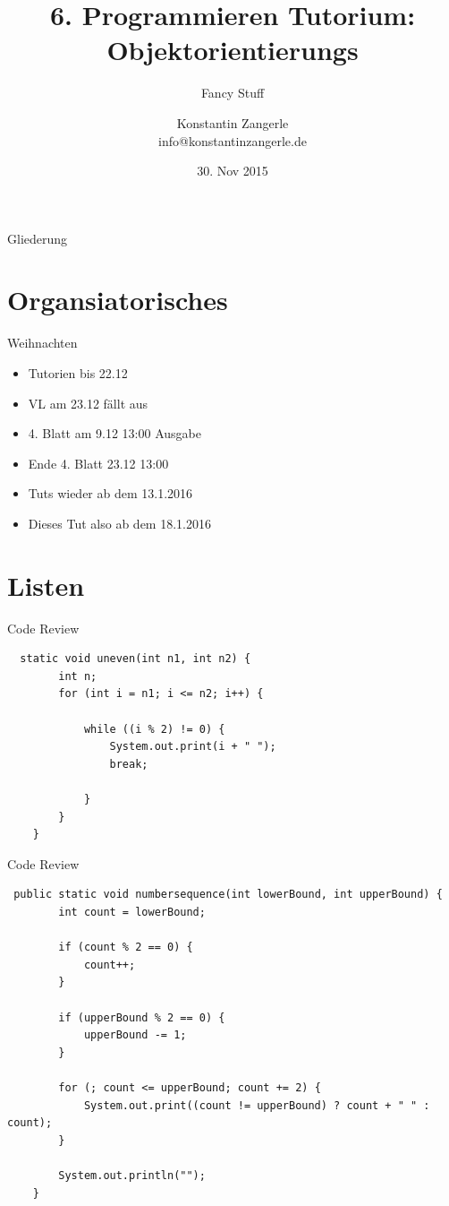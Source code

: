\documentclass[18pt]{beamer}
\title[Programmieren Tutorium]{6. Programmieren Tutorium:\texorpdfstring{\\}{} Objektorientierungs}
\subtitle{Fancy Stuff}
\author{Konstantin Zangerle \texorpdfstring{\\}{} info@konstantinzangerle.de}
\date{30. Nov 2015}
\begin{document}

\begin{frame}
\titlepage
\end{frame}

\begin{frame}{Gliederung}
\tableofcontents
\end{frame}

\section{Organsiatorisches}

\begin{frame}{Weihnachten}
 \begin{itemize}
  \item Tutorien bis 22.12
  \item VL am 23.12 fällt aus
  \item 4. Blatt am 9.12 13:00 Ausgabe
  \item Ende 4. Blatt 23.12 13:00
  \item Tuts wieder ab dem 13.1.2016
  \item Dieses Tut also ab dem 18.1.2016
 \end{itemize}

\end{frame}

\section{Listen}
\begin{frame}[fragile]{Code Review}
 \begin{lstlisting}
  static void uneven(int n1, int n2) {
        int n;
        for (int i = n1; i <= n2; i++) {
            
            while ((i % 2) != 0) {
                System.out.print(i + " ");
                break;

            }
        }
    }
 \end{lstlisting}
\end{frame}

\begin{frame}[fragile]{Code Review}
 \begin{lstlisting}
 public static void numbersequence(int lowerBound, int upperBound) {
        int count = lowerBound;

        if (count % 2 == 0) {
            count++;
        }

        if (upperBound % 2 == 0) {
            upperBound -= 1;
        }

        for (; count <= upperBound; count += 2) {
            System.out.print((count != upperBound) ? count + " " : count);
        }

        System.out.println("");
    }


 \end{lstlisting}
\end{frame}
\end{document}
